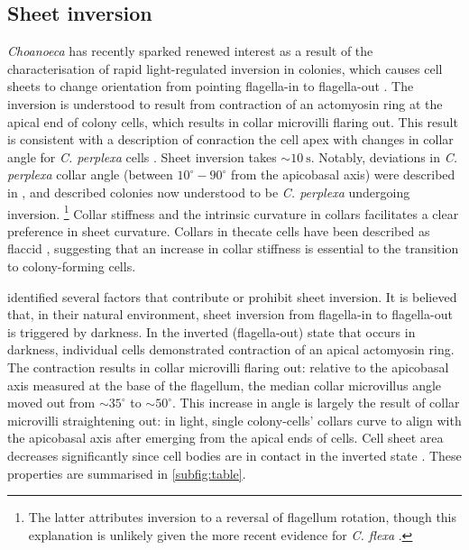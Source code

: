 
\subsection{Sheet inversion}

\textit{Choanoeca} has recently sparked renewed interest as a result of the characterisation of rapid light-regulated inversion in colonies, which causes cell sheets to change orientation from pointing flagella-in to flagella-out \citep{brunet2019}.
The inversion is understood to result from contraction of an actomyosin ring at the apical end of colony cells, which results in collar microvilli flaring out. 
This result is consistent with a description of conraction the cell apex with changes in collar angle for \textit{C. perplexa} cells \citep{leadbeater1977}.
Sheet inversion takes $\sim\SI{10}{\second}$.
Notably, deviations in \textit{C. perplexa} collar angle (between $10^\circ-90^\circ$ from the apicobasal axis) were described in \citet{ellis1930}, and \citet{leadbeater1983} described colonies now understood to be \textit{C. perplexa} undergoing inversion. 
\footnote{The latter attributes inversion to a reversal of flagellum rotation, though this explanation is unlikely given the more recent evidence for \textit{C. flexa} \citep{brunet2019}.}
Collar stiffness and the intrinsic curvature in collars facilitates a clear preference in sheet curvature. 
Collars in thecate cells have been described as flaccid \citep{leadbeater1977}, suggesting that an increase in collar stiffness is essential to the transition to colony-forming cells. 

\citet{brunet2019} identified several factors that contribute or prohibit sheet inversion. 
It is believed that, in their natural environment, sheet inversion from flagella-in to flagella-out is triggered by darkness. 
In the inverted (flagella-out) state that occurs in darkness, individual cells demonstrated contraction of an apical actomyosin ring.
The contraction results in collar microvilli flaring out: relative to the apicobasal axis measured at the base of the flagellum, the median collar microvillus angle moved out from $\sim35^\circ$ to $\sim50^\circ$.
This increase in angle is largely the result of collar microvilli straightening out: in light, single colony-cells' collars curve to align with the apicobasal axis after emerging from the apical ends of cells.
Cell sheet area decreases significantly since cell bodies are in contact in the inverted state \citep{thibaut}.
These properties are summarised in \cref{subfig:table}.

